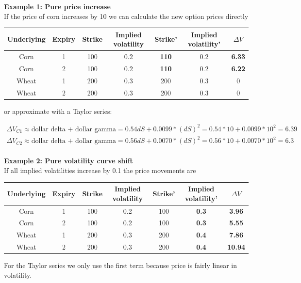 \medskip
\textbf{Example 1: Pure price increase}\\

If the price of corn increases by 10 we can calculate the new option prices directly
\medskip

\begin{tabular}{|c|c|c|c|c|c|c|}
\hline
Underlying & Expiry & Strike & Implied volatility & Strike' & Implied volatility' & $\Delta V$\\ 
\hline
Corn & 1 & 100 & 0.2 & \textbf{110} & 0.2 &\textbf{ 6.33} \\
Corn & 2 & 100 & 0.2& \textbf{110} & 0.2 & \textbf{6.22} \\
Wheat & 1 & 200 & 0.3& 200 & 0.3 & 0\\
Wheat & 2 & 200 & 0.3& 200 & 0.3 &  0\\
\hline
\end{tabular}

\medskip

or approximate with a Taylor series:

\begin{eqnarray*}
\Delta V_{C1} \approx \mbox{dollar delta + dollar gamma} = 0.54 dS + 0.0099*(dS)^2 = 0.54*10+0.0099*10^2 = 6.39\\
\Delta V_{C2} \approx \mbox{dollar delta + dollar gamma} = 0.56 dS + 0.0070*(dS)^2= 0.56*10+0.0070*10^2 = 6.3\\
\end{eqnarray*}

\textbf{Example 2: Pure volatility curve shift}\\

If all implied volatilities increase by 0.1 the price movements are

\begin{tabular}{|c|c|c|c|c|c|c|}
\hline
Underlying & Expiry & Strike & Implied volatility & Strike' & Implied volatility' & $\Delta V$\\ 
\hline
Corn & 1 & 100 & 0.2 & 100& \textbf{0.3} & \textbf{3.96} \\
Corn & 2 & 100 & 0.2& 100 & \textbf{0.3} & \textbf{5.55} \\
Wheat & 1 & 200 & 0.3& 200 & \textbf{0.4} & \textbf{7.86} \\
Wheat & 2 & 200 & 0.3& 200 & \textbf{0.4} & \textbf{10.94}  \\
\hline
\end{tabular}

For the Taylor series we only use the first term because price is fairly linear in volatility. 

